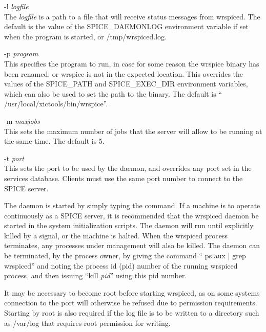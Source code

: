 {\begin{description}
\item{{\vt -l} {\it logfile}}\\
The {\it logfile} is a path to a file that will receive status
messages from {\vt wrspiced}.  The default is the value of the {\et
SPICE\_DAEMONLOG} environment variable if set when the program is
started, or {\vt /tmp/wrspiced.log}.

\item{{\vt -p} {\it program}}\\
This specifies the {\WRspice} program to run, in case for some reason
the {\vt wrspice} binary has been renamed, or {\vt wrspice} is not in
the expected location.  This overrides the values of the {\et
SPICE\_PATH} and {\et SPICE\_EXEC\_DIR} environment variables, which
can also be used to set the path to the binary.  The default is ``{\vt
/usr/local/xictools/bin/wrspice}''.

\item{{\vt -m} {\it maxjobs}}\\
This sets the maximum number of jobs that the server will allow to be
running at the same time.  The default is 5.

\item{{\vt -t} {\it port}}\\
This sets the port to be used by the daemon, and overrides any port
set in the services database.  Clients must use the same port number
to connect to the SPICE server.
\end{description}

The daemon is started by simply typing the command.  If a machine is
to operate continuously as a SPICE server, it is recommended that the
{\vt wrspiced} daemon be started in the system initialization scripts. 
The daemon will run until explicitly killed by a signal, or the
machine is halted.  When the {\vt wrspiced} process terminates, any
{\WRspice} processes under management will also be killed.  The daemon
can be terminated, by the process owner, by giving the command ``{\vt
ps aux | grep wrspiced}'' and noting the process id (pid) number of
the running {\vt wrspiced} process, and then issuing ``{\vt kill} {\it
pid\/}'' using this pid number.

It may be necessary to become root before starting {\vt wrspiced}, as
on some systems connection to the port will otherwise be refused due
to permission requirements.  Starting by root is also required if the
log file is to be written to a directory such as {\vt /var/log} that
requires root permission for writing.

}
